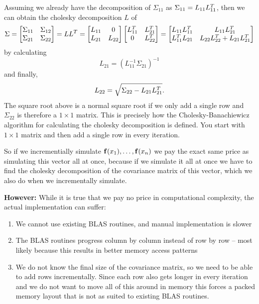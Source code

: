 Assuming we already have the decomposition of \(\Sigma_{11}\)
as \(\Sigma_{11} = L_{11}L_{11}^T\), then we can obtain
the cholesky decomposition \(L\) of
\[
    \Sigma = \begin{bmatrix}
        \Sigma_{11} & \Sigma_{12}
        \\
        \Sigma_{21} & \Sigma_{22}
    \end{bmatrix}
    = L L^T
    = \begin{bmatrix}
        L_{11} & 0
        \\
        L_{21} & L_{22}
    \end{bmatrix}
    \begin{bmatrix}
        L_{11}^T & L_{21}^T
        \\
        0 & L_{22}^T
    \end{bmatrix}
    = \begin{bmatrix}
        L_{11}L_{11}^T & L_{11}L_{21}^T
        \\
        L_{11}^T L_{21} & L_{22}L_{22}^T + L_{21}L_{21}^T
    \end{bmatrix}
\]
by calculating
\[
    L_{21} = (L_{11}^{-1}\Sigma_{21})^{-1}
\]
and finally,
\[
    L_{22} = \sqrt{\Sigma_{22} - L_{21}L_{21}^T}.
\]
The square root above is a normal square root if we only add a single row
and \(\Sigma_{22}\) is therefore a \(1\times 1\) matrix.
This is precisely how the Cholesky-Banachiewicz
algorithm for calculating the cholesky decomposition is defined.
You start with \(1\times 1\) matrix and then add a single row in every
iteration.

So if we incrementially simulate \(\mathbf{f}(x_1), \dots, \mathbf{f}(x_n)\)
we pay the exact same price as simulating this vector all at once, because
if we simulate it all at once we have to find the cholesky decomposition
of the covariance matrix of this vector, which we also do when we incrementally
simulate.

\textbf{However:} While it is true that we pay no price in computational complexity,
the actual implementation can suffer:
\begin{enumerate}
    \item We cannot use existing BLAS routines, and manual implementation is slower
    \item The BLAS routines progress column by column instead of row by row -- most likely
    because this results in better memory access patterns
    \item We do not know the final size of the covariance matrix, so we need to be able
    to add rows incrementally. Since each row also gets longer in every iteration and we
    do not want to move all of this around in memory this forces a packed memory layout 
    that is not as suited to existing BLAS routines.
\end{enumerate}

